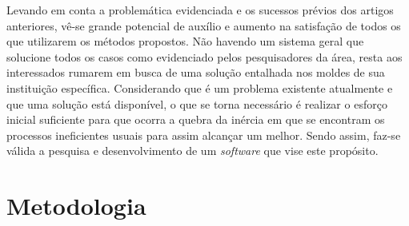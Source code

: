 Levando em conta a problemática evidenciada e os sucessos prévios dos artigos anteriores, vê-se grande potencial de auxílio e aumento na satisfação de todos os que utilizarem os métodos propostos. Não havendo um sistema geral que solucione todos os casos como evidenciado pelos pesquisadores da área, resta aos interessados rumarem em busca de uma solução entalhada nos moldes de sua instituição específica. Considerando que é um problema existente atualmente e que uma solução está disponível, o que se torna necessário é realizar o esforço inicial suficiente para que ocorra a quebra da inércia em que se encontram os processos ineficientes usuais para assim alcançar um melhor. Sendo assim, faz-se válida a pesquisa e desenvolvimento de um \textit{software} que vise este propósito.


\section{Metodologia} %



